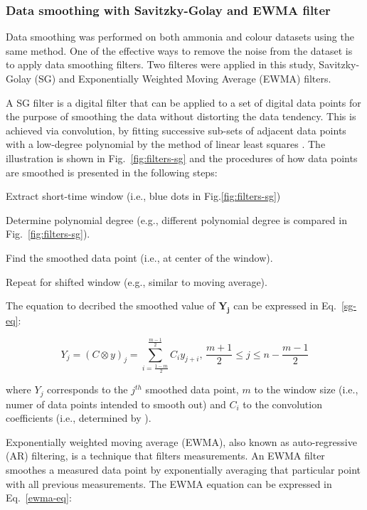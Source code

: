 \subsubsection{Data smoothing with Savitzky-Golay and EWMA filter}
Data smoothing was performed on both ammonia and colour datasets using the same method. One of the effective ways to remove the noise from the dataset is to apply data smoothing filters. Two filteres were applied in this study, Savitzky-Golay (SG) and Exponentially Weighted Moving Average (EWMA) filters.

A SG filter is a digital filter that can be applied to a set of digital data points for the purpose of smoothing the data without distorting the data tendency. This is achieved via convolution, by fitting successive sub-sets of adjacent data points with a low-degree polynomial by the method of linear least squares \citep{wikipediaSavitzkyGolayFilter2022}. The illustration is shown in Fig.~\ref{fig:filters-sg} and the procedures of how data points are smoothed is presented in the following steps:

\noindent
\begin{myenumerate}
    \item Extract short-time window (i.e., blue dots in Fig.\ref{fig:filters-sg})
    \item Determine polynomial degree (e.g., different polynomial degree is compared in Fig.~\ref{fig:filters-sg}).
    \item Find the smoothed data point (i.e., at center of the window).
    \item Repeat for shifted window (e.g., similar to moving average).
\end{myenumerate}

The equation to decribed the smoothed value of $\bm{Y_j}$ can be expressed in Eq.~\ref{sg-eq}:

\begin{equation}\label{sg-eq}
    Y_j=(C\otimes y)_j=\sum_{i=\frac{1-m}{2}}^{\frac{m-1}{2}}C_iy_{j+i},\,\frac{m+1}{2}\le j\le n-\frac{m-1}{2}
\end{equation}

\noindent
where $Y_j$ corresponds to the $j^{th}$ smoothed data point, $m$ to the window size (i.e., numer of data points intended to smooth out) and $C_i$ to the convolution coefficients (i.e., determined by \citet{savitzkySmoothingDifferentiationData1964}). 

Exponentially weighted moving average (EWMA), also known as auto-regressive (AR) filtering, is a technique that filters measurements. An EWMA filter smoothes a measured data point by exponentially averaging that particular point with all previous measurements. The EWMA equation can be expressed in Eq.~\ref{ewma-eq}:

